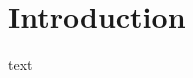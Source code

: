 \documentclass[12pt]{article}
\begin{document}



\newpage
\tableofcontents


%
%
%

%


\newpage
\section{Introduction}
text
\end{document}
